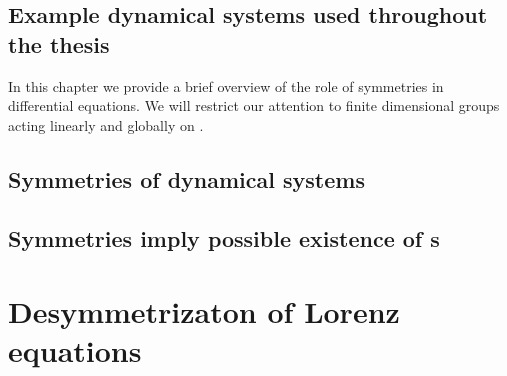     \section{Example dynamical systems used throughout the thesis}
    \label{s:exampleIntro}
    


In this chapter we provide a brief overview of the role of
symmetries in differential equations. We will restrict our
attention to finite dimensional groups acting linearly and
globally on .

 \section{Symmetries of dynamical systems}
        \label{sec:symIntro}
        

  \section{Symmetries imply possible existence of \rpo s}
        \label{sec:SymRPO}
        
        


\chapter{Desymmetrizaton of Lorenz equations}
\label{chap:Lorenz}
    


